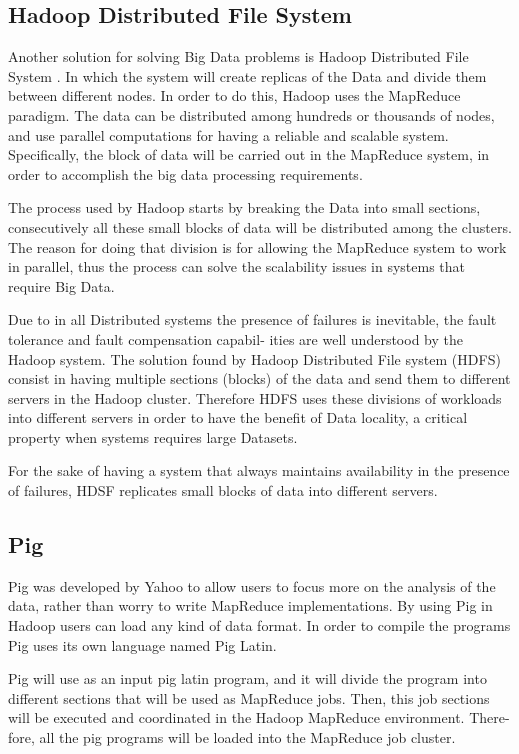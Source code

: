 \subsection{Hadoop Distributed File System}

Another solution for solving Big Data problems is Hadoop Distributed File System \cite{shvachko2010hadoop}. In which the system will create replicas of the Data and divide them between different nodes. In order to do this, Hadoop uses the MapReduce paradigm. The data can be distributed among hundreds or thousands of nodes, and use parallel computations for having a reliable and scalable system. Specifically, the block of data will be carried out in the MapReduce system, in order to accomplish the big data processing requirements.

The process used by Hadoop starts by breaking the Data into small sections, consecutively all these small blocks of data will be distributed among the clusters. The reason for doing that division is for allowing the MapReduce system to work in parallel, thus the process can solve the scalability issues in systems that require Big Data.

Due to in all Distributed systems the presence of failures is inevitable, the fault tolerance and fault compensation capabil- ities are well understood by the Hadoop system. The solution found by Hadoop Distributed File system (HDFS) consist in having multiple sections (blocks) of the data and send them to different servers in the Hadoop cluster. Therefore HDFS uses these divisions of workloads into different servers in order to have the benefit of Data locality, a critical property when systems requires large Datasets.

For the sake of having a system that always maintains availability in the presence of failures, HDSF replicates small blocks of data into different servers.

\subsection{Pig}

Pig \cite{gates2009building} was developed by Yahoo to allow users to focus more on the analysis of the data, rather than worry to write MapReduce implementations. By using Pig in Hadoop users can load any kind of data format. In order to compile the programs Pig uses its own language named Pig Latin.

Pig will use as an input pig latin program, and it will divide the program into different sections that will be used as MapReduce jobs. Then, this job sections will be executed and coordinated in the Hadoop MapReduce environment. There- fore, all the pig programs will be loaded into the MapReduce job cluster.

